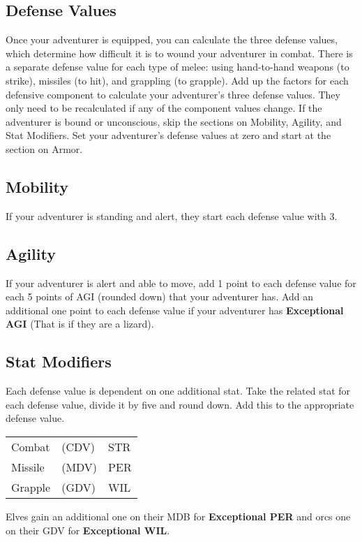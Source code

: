 \setlength{\columnsep}{\defcolwidth}
\begin{multicols*}{2}
\section{Defense Values}
Once your adventurer is equipped, you can calculate the three defense values, which determine how difficult it is to wound your adventurer in combat. There is a separate defense value for each type of melee: using hand-to-hand weapons (to strike), missiles (to hit), and grappling (to grapple). Add up the factors for each defensive component to calculate your adventurer's three defense values. They only need to be recalculated if any of the component values change.
If the adventurer is bound or unconscious, skip the sections on Mobility, Agility, and Stat Modifiers. Set your adventurer's defense values at zero and start at the section on Armor.
\subsection{Mobility}
If your adventurer is standing and alert, they start each defense value with 3.
\subsection{Agility}
If your adventurer is alert and able to move, add 1 point to each defense value for each 5 points of AGI (rounded down) that your adventurer has. Add an additional one point to each defense value if your adventurer has \textbf{Exceptional AGI} (That is if they are a lizard).
\subsection{Stat Modifiers}
Each defense value is dependent on one additional stat. Take the related stat for each defense value, divide it by five and round down. Add this to the appropriate defense value.
\begin{normbox}
\begin{tabular}{@{}l l l}
Combat & (CDV) & STR\\
Missile & (MDV) & PER\\
Grapple & (GDV) & WIL\\
\end{tabular}
\end{normbox}
Elves gain an additional one on their MDB for \textbf{Exceptional PER} and orcs one on their GDV for \textbf{Exceptional WIL}.

\end{multicols*}

